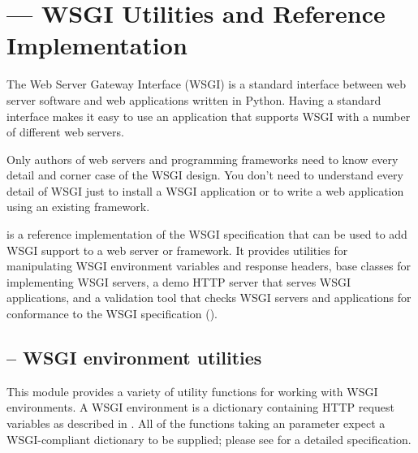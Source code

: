\section{ --- WSGI Utilities and Reference
Implementation}

The Web Server Gateway Interface (WSGI) is a standard interface
between web server software and web applications written in Python.
Having a standard interface makes it easy to use an application
that supports WSGI with a number of different web servers.

Only authors of web servers and programming frameworks need to know
every detail and corner case of the WSGI design.  You don't need to
understand every detail of WSGI just to install a WSGI application or
to write a web application using an existing framework.

 is a reference implementation of the WSGI specification
that can be used to add WSGI support to a web server or framework.  It
provides utilities for manipulating WSGI environment variables and
response headers, base classes for implementing WSGI servers, a demo
HTTP server that serves WSGI applications, and a validation tool that
checks WSGI servers and applications for conformance to the
WSGI specification ().















\subsection{ -- WSGI environment utilities}

This module provides a variety of utility functions for working with
WSGI environments.  A WSGI environment is a dictionary containing
HTTP request variables as described in .  All of the functions
taking an  parameter expect a WSGI-compliant dictionary to
be supplied; please see  for a detailed specification.

